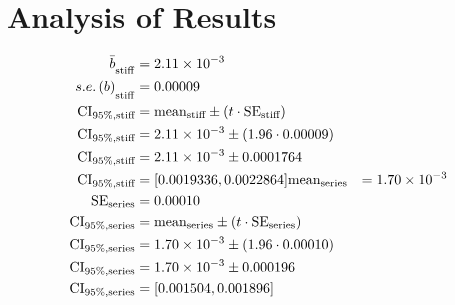 \section{Analysis of Results}

\lipsum[6-9]
\begin{align*}
\bar{b}_{\textsubscript{stiff}} &= 2.11 \times 10^{-3} \\
{s.e.\left( b \right)} _{\textsubscript{stiff}} &= 0.00009 \\
\text{CI}_{95\%,\text{stiff}} &= \text{mean}_{\text{stiff}} \pm (t \cdot \text{SE}_{\text{stiff}}) \\
\text{CI}_{95\%,\text{stiff}} &= 2.11 \times 10^{-3} \pm (1.96 \cdot 0.00009) \\
\text{CI}_{95\%,\text{stiff}} &= 2.11 \times 10^{-3} \pm 0.0001764 \\
\text{CI}_{95\%,\text{stiff}} &= [0.0019336, 0.0022864]
\text{mean}_{\text{series}} &= 1.70 \times 10^{-3} \\
\text{SE}_{\text{series}} &= 0.00010 \\
\text{CI}_{95\%,\text{series}} &= \text{mean}_{\text{series}} \pm (t \cdot \text{SE}_{\text{series}}) \\
\text{CI}_{95\%,\text{series}} &= 1.70 \times 10^{-3} \pm (1.96 \cdot 0.00010) \\
\text{CI}_{95\%,\text{series}} &= 1.70 \times 10^{-3} \pm 0.000196 \\
\text{CI}_{95\%,\text{series}} &= [0.001504, 0.001896]
\end{align*}
\lipsum[10-13]
